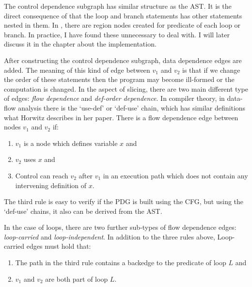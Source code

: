 \documentclass[oneside,12pt,a4paper]{book}
\begin{document}
The control dependence subgraph has similar structure as the AST. It is the direct consequence of that the loop and branch statements has other statements nested in them. In \cite{efficient-pdg}, there are region nodes created for predicate of each loop or branch. In practice, I have found these unnecessary to deal with. I will later discuss it in the chapter about the implementation. 

After constructing the control dependence subgraph, data dependence edges are added. The meaning of this kind of edge between $v_1$ and $v_2$ is that if we change the order of these statements then the program may become ill-formed or the computation is changed. In the aspect of slicing, there are two main different type of edges: \textit{flow dependence} and \textit{def-order dependence}. In compiler theory, in data-flow analysis there is the `use-def' or `def-use' chain, which has similar definitions what Horwitz describes in her paper. There is a flow dependence edge between nodes $v_1$ and $v_2$ if:
\begin{enumerate}
\item $v_1$ is a node which defines variable $x$ and
\item $v_2$ uses $x$ and
\item Control can reach $v_2$ after $v_1$ in an execution path which does not contain any intervening definition of $x$.
\end{enumerate}

The third rule is easy to verify if the PDG is built using the CFG, but using the `def-use' chains, it also can be derived from the AST. 

In the case of loops, there are two further sub-types of flow dependence edges: \textit{loop-carried} and \textit{loop-independent}. In addition to the three rules above, Loop-carried edges must hold that:
\begin{enumerate}
\item The path in the third rule contains a backedge to the predicate of loop $L$ and
\item $v_1$ and $v_2$ are both part of loop $L$.
\end{enumerate}
\end{document}
